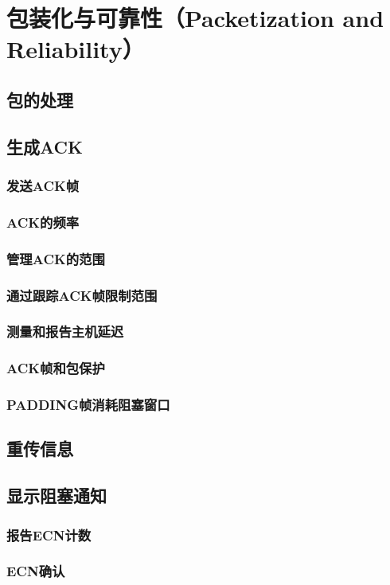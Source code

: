 \section{包装化与可靠性（Packetization and Reliability）}

\subsection{包的处理}

\subsection{生成ACK}

\subsubsection{发送ACK帧}
\subsubsection{ACK的频率}
\subsubsection{管理ACK的范围}
\subsubsection{通过跟踪ACK帧限制范围}
\subsubsection{测量和报告主机延迟}
\subsubsection{ACK帧和包保护}
\subsubsection{PADDING帧消耗阻塞窗口}

\subsection{重传信息}

\subsection{显示阻塞通知}
\subsubsection{报告ECN计数}
\subsubsection{ECN确认}